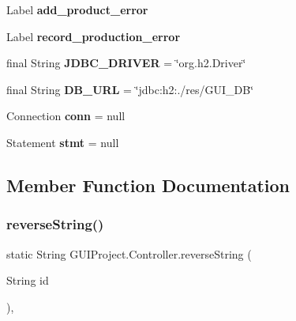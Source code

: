 \begin{DoxyCompactItemize}
\mbox{\label{class_g_u_i_project_1_1_controller_aa762a4f99e68d861f172489602814340}} 
Label {\bfseries add\+\_\+product\+\_\+error}
\item 
\mbox{\label{class_g_u_i_project_1_1_controller_a96fcd8ac368b7bcc76175b35103b3324}} 
Label {\bfseries record\+\_\+production\+\_\+error}
\item 
\mbox{\label{class_g_u_i_project_1_1_controller_afae40d40d850e9975050deb1a9c0aad7}} 
final String {\bfseries J\+D\+B\+C\+\_\+\+D\+R\+I\+V\+ER} = \char`\"{}org.\+h2.\+Driver\char`\"{}
\item 
\mbox{\label{class_g_u_i_project_1_1_controller_a6029af42338afff522ee46425f0fb903}} 
final String {\bfseries D\+B\+\_\+\+U\+RL} = \char`\"{}jdbc\+:h2\+:./res/G\+U\+I\+\_\+\+DB\char`\"{}
\item 
\mbox{\label{class_g_u_i_project_1_1_controller_a5c7cd207a0bd00360c2c49fad1949bbd}} 
Connection {\bfseries conn} = null
\item 
\mbox{\label{class_g_u_i_project_1_1_controller_a56bec39a43a75bcd0f1be43b1b15a8a1}} 
Statement {\bfseries stmt} = null
\end{DoxyCompactItemize}


\subsection{Member Function Documentation}
\mbox{\label{class_g_u_i_project_1_1_controller_aa2699a52331ff1977530bcaa3eaf656e}} 
\subsubsection{\texorpdfstring{reverseString()}{reverseString()}}
{\footnotesize\ttfamily static String G\+U\+I\+Project.\+Controller.\+reverse\+String (\begin{DoxyParamCaption}\item[{String}]{id }\end{DoxyParamCaption})\hspace{0.3cm}{\ttfamily [static]}, {\ttfamily [private]}}


